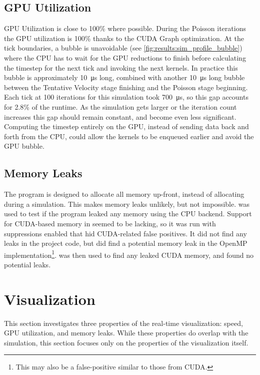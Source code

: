 \subsection{GPU Utilization}\label{sec:Results:Sim:Efficiency}

GPU Utilization is close to 100\% where possible.
During the Poisson iterations the GPU utilization is 100\% thanks to the CUDA Graph optimization.
At the tick boundaries, a bubble is unavoidable (see \cref{fig:results:sim_profile_bubble}) where the CPU has to wait for the GPU reductions to finish before calculating the timestep for the next tick and invoking the next kernels.
In practice this bubble is approximately \SI{10}{\micro\second} long, combined with another \SI{10}{\micro\second} long bubble between the Tentative Velocity stage finishing and the Poisson stage beginning.
Each tick at 100 iterations for this simulation took \SI{700}{\micro\second}, so this gap accounts for 2.8\% of the runtime.
As the simulation gets larger or the iteration count increases this gap should remain constant, and become even less significant.
Computing the timestep entirely on the GPU, instead of sending data back and forth from the CPU, could allow the kernels to be enqueued earlier and avoid the GPU bubble.

\subsection{Memory Leaks}\label{sec:Results:Sim:Mem}
The program is designed to allocate all memory up-front, instead of allocating during a simulation.
This makes memory leaks unlikely, but not impossible.
 was used to test if the program leaked any memory using the CPU backend.
Support for CUDA-based memory in  seemed to be lacking, so it was run with suppressions enabled that hid CUDA-related false positives.
It did not find any leaks in the project code, but did find a potential memory leak in the OpenMP implementation\footnote{This may also be a false-positive similar to those from CUDA.}.
 was then used to find any leaked CUDA memory, and found no potential leaks.

\pagebreak
\section{Visualization}\label{sec:Results:Viz}
This section investigates three properties of the real-time visualization: speed, GPU utilization, and memory leaks.
While these properties do overlap with the simulation, this section focuses only on the properties of the visualization itself.

